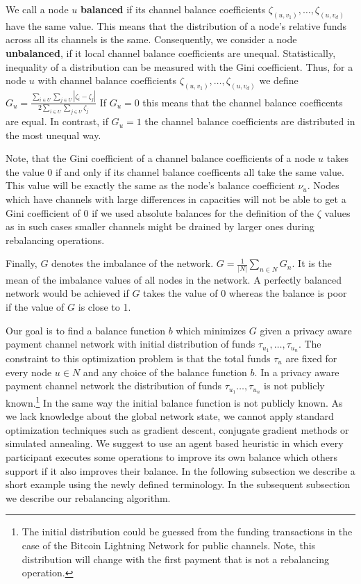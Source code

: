 \documentclass[a4paper]{paper}
\begin{document}
We call a node $u$ {\bf balanced} if its channel balance coefficients $\zeta_{(u,v_1)},\dots,\zeta_{(u,v_d)}$ have the same value.
This means that the distribution of a node's relative funds across all its channels is the same.
Consequently, we consider a node {\bf unbalanced}, if it local channel balance coefficients are unequal.
Statistically, inequality of a distribution can be measured with the Gini coefficient.
Thus, for a node $u$ with channel balance coefficients $\zeta_{(u,v_1)},\dots,\zeta_{(u,v_d)}$ we define $G_u = \frac{\displaystyle{\sum_{i\in U} \sum_{j \in U}} | \zeta_i - \zeta_j |}{2 \displaystyle{\sum_{i \in U} \sum_{j \in U} \zeta_j}}$
If $G_u = 0$ this means that the channel balance coefficents are equal.
In contrast, if $G_u = 1$ the channel balance coefficients are distributed in the most unequal way.

Note, that the Gini coefficient of a channel balance coefficients of a node $u$ takes the value $0$ if and only if its channel balance coefficents all take the same value.
This value will be exactly the same as the node's balance coefficient $\nu_u$.
Nodes which have channels with large differences in capacities will not be able to get a Gini coefficient of 0 if we used absolute balances for the definition of the $\zeta$ values as in such cases smaller channels might be drained by larger ones during rebalancing operations.

Finally, $G$ denotes the imbalance of the network. $G = \displaystyle{\frac{1}{|N|}\sum_{n\in N}G_n}$. It is the mean of the imbalance values of all nodes in the network.
A perfectly balanced network would be achieved if $G$ takes the value of $0$ whereas the balance is poor if the value of $G$ is close to 1.

Our goal is to find a balance function $b$ which minimizes $G$ given a privacy aware payment channel network with initial distribution of funds $\tau_{u_1},\dots,\tau_{u_n}$.
The constraint to this optimization problem is that the total funds $\tau_u$ are fixed for every node $u \in N$ and any choice of the balance function $b$.
In a privacy aware payment channel network the distribution of funds $\tau_{u_1}\dots,\tau_{u_n}$ is not publicly known.\footnote{The initial distribution could be guessed from the funding transactions in the case of the Bitcoin Lightning Network for public channels. Note, this distribution will change with the first payment that is not a rebalancing operation.}
In the same way the initial balance function is not publicly known.
As we lack knowledge about the global network state, we cannot apply standard optimization techniques such as gradient descent, conjugate gradient methods or simulated annealing.
We suggest to use an agent based heuristic in which every participant executes some operations to improve its own balance which others support if it also improves their balance.
In the following subsection we describe a short example using the newly defined terminology. In the subsequent subsection we describe our rebalancing algorithm.
\end{document}
